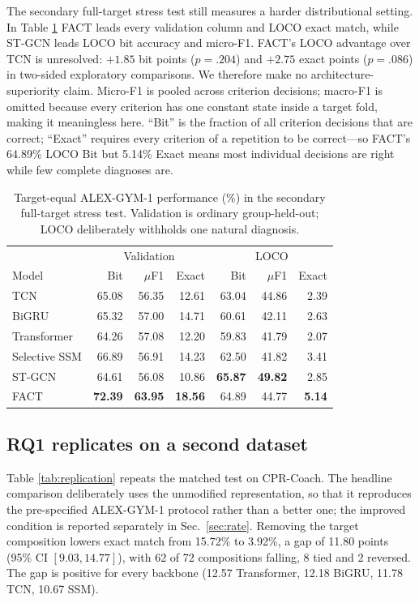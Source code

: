 \documentclass[conference,a4paper]{IEEEtran}
\begin{document}
The secondary full-target stress test still measures a harder distributional
setting. In Table \ref{tab:models} FACT leads every validation column and LOCO
exact match, while ST-GCN leads LOCO bit accuracy and micro-F1. FACT's LOCO
advantage over TCN is unresolved: $+1.85$ bit points ($p=.204$) and $+2.75$
exact points ($p=.086$) in two-sided exploratory comparisons. We therefore make
no architecture-superiority claim. Micro-F1 is pooled across
criterion decisions; macro-F1 is omitted because every criterion has one
constant state inside a target fold, making it meaningless here. ``Bit'' is the
fraction of all criterion decisions that are correct; ``Exact'' requires every
criterion of a repetition to be correct---so FACT's 64.89\% LOCO Bit but 5.14\%
Exact means most individual decisions are right while few complete diagnoses
are.

\begin{table}[t]
\centering
\caption{Target-equal ALEX-GYM-1 performance (\%) in the secondary full-target
stress test. Validation is ordinary group-held-out; LOCO deliberately withholds
one natural diagnosis.}
\label{tab:models}
\scriptsize
\setlength{\tabcolsep}{3.2pt}
\begin{tabular}{lrrrrrr}
\toprule
& \multicolumn{3}{c}{Validation} & \multicolumn{3}{c}{LOCO}\\
Model & Bit & $\mu$F1 & Exact & Bit & $\mu$F1 & Exact\\
\midrule
TCN & 65.08 & 56.35 & 12.61 & 63.04 & 44.86 & 2.39\\
BiGRU & 65.32 & 57.00 & 14.71 & 60.61 & 42.11 & 2.63\\
Transformer & 64.26 & 57.08 & 12.20 & 59.83 & 41.79 & 2.07\\
Selective SSM & 66.89 & 56.91 & 14.23 & 62.50 & 41.82 & 3.41\\
ST-GCN & 64.61 & 56.08 & 10.86 & \textbf{65.87} & \textbf{49.82} & 2.85\\
FACT & \textbf{72.39} & \textbf{63.95} & \textbf{18.56} & 64.89 & 44.77 & \textbf{5.14}\\
\bottomrule
\end{tabular}
\end{table}

\subsection{RQ1 replicates on a second dataset}
Table \ref{tab:replication} repeats the matched test on CPR-Coach. The headline
comparison deliberately uses the unmodified representation, so that it
reproduces the pre-specified ALEX-GYM-1 protocol rather than a better one; the
improved condition is reported separately in Sec.~\ref{sec:rate}. Removing the
target composition lowers exact match from 15.72\% to 3.92\%, a gap of 11.80
points (95\% CI $[9.03,14.77]$), with 62 of 72 compositions falling, 8 tied and
2 reversed. The gap is positive for every backbone (12.57 Transformer, 12.18
BiGRU, 11.78 TCN, 10.67 SSM).
\end{document}
